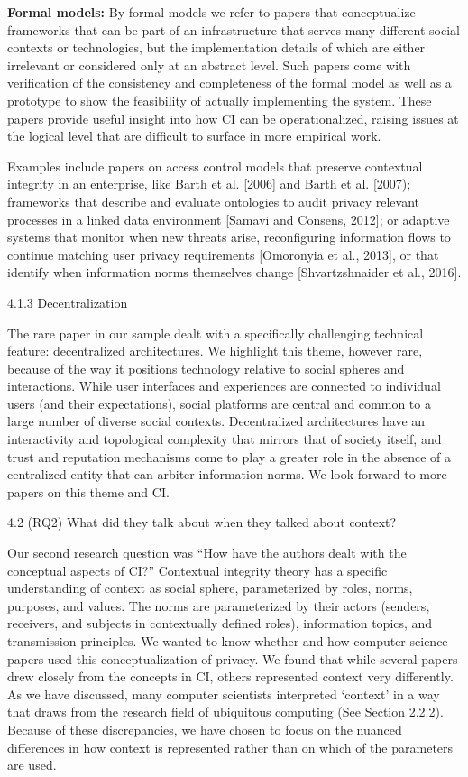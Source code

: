 \documentclass[../thesis.tex]{subfiles}
\begin{document}
\bigskip

\textbf{Formal models: }By formal models we refer to papers that
conceptualize frameworks that can be part of an infrastructure that
serves many different social contexts or technologies, but the
implementation details of which are either irrelevant or considered
only at an abstract level. Such papers come with verification of the
consistency and completeness of the formal model as well as a prototype
to show the feasibility of actually implementing the system. These
papers provide useful insight into how CI can be operationalized,
raising issues at the logical level that are difficult to surface in
more empirical work.


\bigskip

Examples include papers on access control models that preserve
contextual integrity in an enterprise, like Barth et al. [2006] and
Barth et al. [2007); frameworks that describe and evaluate ontologies
to audit privacy relevant processes in a linked data environment
[Samavi and Consens, 2012]; or adaptive systems that monitor when new
threats arise, reconfiguring information flows to continue matching
user privacy requirements [Omoronyia et al., 2013], or that identify
when information norms themselves change [Shvartzshnaider et al.,
2016]. 

{\color[rgb]{0.4,0.4,0.4}
4.1.3 Decentralization}

The rare paper in our sample dealt with a specifically challenging
technical feature: decentralized architectures. We highlight this
theme, however rare, because of the way it positions technology
relative to social spheres and interactions. While user interfaces and
experiences are connected to individual users (and their expectations),
social platforms are central and common to a large number of diverse
social contexts. Decentralized architectures have an interactivity and
topological complexity that mirrors that of society itself, and trust
and reputation mechanisms come to play a greater role in the absence of
a centralized entity that can arbiter information norms. We look
forward to more papers on this theme and CI.

4.2 (RQ2) What did they talk about when they talked about context?


\bigskip

Our second research question was ``How have the authors
dealt with the conceptual aspects of CI?'' Contextual
integrity theory has a specific understanding of context as social
sphere, parameterized by roles, norms, purposes, and values. The norms
are parameterized by their actors (senders, receivers, and subjects in
contextually defined roles), information topics, and transmission
principles. We wanted to know whether and how computer science papers
used this conceptualization of privacy. We found that while several
papers drew closely from the concepts in CI, others represented context
very differently. As we have discussed, many computer scientists
interpreted {\textquoteleft}context' in a way that
draws from the research field of ubiquitous computing (See Section
2.2.2). Because of these discrepancies, we have chosen to focus on the
nuanced differences in how context is represented rather than on which
of the parameters are used.
\end{document}
